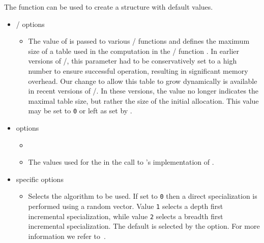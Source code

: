 The function 
can be used to create a  structure
with default values.

\begin{itemize}
\item \PolyLib/ options

\begin{itemize}

\item {}

The value of  is passed to various \PolyLib/
functions and defines the
maximum size of a table used in the  computation
in the \PolyLib/ function .
In earlier versions of \PolyLib/,
this parameter had to be conservatively set
to a high number to ensure successful operation,
resulting in significant memory overhead.
Our change to allow this table to grow
dynamically is available in recent versions of \PolyLib/.
In these versions, the value no longer indicates the maximal
table size, but rather the size of the initial allocation.
This value may be set to \verb+0+ or left as set
by .

\end{itemize}

\item {} options

\begin{itemize}

\item {}
\item {}

The values used for the 
in the call to 's implementation of .

\end{itemize}

\item {} specific options

\begin{itemize}

\item {}

Selects the  algorithm to be used.
If set to {\tt 0} then a direct specialization is performed
using a random vector.
Value {\tt 1} selects a depth first incremental specialization,
while value {\tt 2} selects a breadth first incremental specialization.
The default is selected by the 
 option.
For more information we refer to~.

\end{itemize}

\end{itemize}


